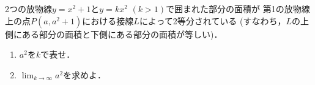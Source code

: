 \documentclass[../../main.tex]{subfiles}
\begin{document}
2つの放物線$y=x^2+1$と$y=kx^2$ $(k>1)$で囲まれた部分の面積が
第1の放物線上の点$P(a,a^2+1)$における接線$L$によって2等分されている
(すなわち，$L$の上側にある部分の面積と下側にある部分の面積が等しい)．
\begin{enumerate}
  \item $a^2$を$k$で表せ．
  \item $\displaystyle\lim_{k\to\infty}a^2$を求めよ．
\end{enumerate}
\end{document}
